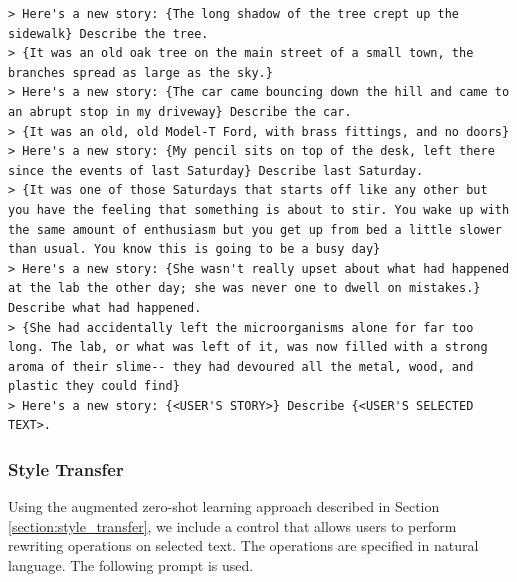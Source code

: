 \begin{lstlisting}
> Here's a new story: {The long shadow of the tree crept up the sidewalk} Describe the tree.
> {It was an old oak tree on the main street of a small town, the branches spread as large as the sky.}
> Here's a new story: {The car came bouncing down the hill and came to an abrupt stop in my driveway} Describe the car.
> {It was an old, old Model-T Ford, with brass fittings, and no doors}
> Here's a new story: {My pencil sits on top of the desk, left there since the events of last Saturday} Describe last Saturday.
> {It was one of those Saturdays that starts off like any other but you have the feeling that something is about to stir. You wake up with the same amount of enthusiasm but you get up from bed a little slower than usual. You know this is going to be a busy day}
> Here's a new story: {She wasn't really upset about what had happened at the lab the other day; she was never one to dwell on mistakes.} Describe what had happened.
> {She had accidentally left the microorganisms alone for far too long. The lab, or what was left of it, was now filled with a strong aroma of their slime-- they had devoured all the metal, wood, and plastic they could find}
> Here's a new story: {<USER'S STORY>} Describe {<USER'S SELECTED TEXT>.
\end{lstlisting}

\subsubsection{Style Transfer}
Using the augmented zero-shot learning approach described in Section \ref{section:style_transfer}, we include a control that allows users to perform rewriting operations on selected text. The operations are specified in natural language.
The following prompt is used.


